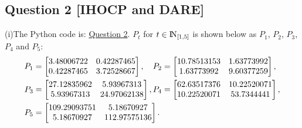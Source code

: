 \documentclass[a4paper,11pt,reqno]{amsart}
\newcommand{\N}{{\rm I\!N}}
\begin{document}
\subsection*{Question 2 [IHOCP and DARE]}\label{sec:q2}
(i)The Python code is: \href{https://github.com/Gczmy/ELE8088/blob/main/Lab1/Python_code/Question2/Question2.py}{Question 2}. 
$P_t$ for $t\in\N_{[1,5]}$ is shown below as $P_1$, $P_2$, $P_3$, $P_4$ and $P_5$:
$$\begin{aligned}
    P_1 &=
    \begin{bmatrix}
        3.48006722 & 0.42287465 \\
        0.42287465 & 3.72528667
    \end{bmatrix}, 
    \ \ \ P_2 =
    \begin{bmatrix}
        10.78513153 & 1.63773992 \\
        1.63773992 & 9.60377259
    \end{bmatrix},
    \\
    P_3 &=
    \begin{bmatrix}
        27.12835962 & 5.93967313 \\
        5.93967313 & 24.97062138
    \end{bmatrix}, 
    P_4 =
    \begin{bmatrix}
        62.63517376 & 10.22520071 \\
        10.22520071 & 53.7344441
    \end{bmatrix},
    \\
    P_5 &=
    \begin{bmatrix}
        109.29093751 & 5.18670927 \\
        5.18670927 & 112.97575136
    \end{bmatrix}.
    \notag
\end{aligned}$$
\end{document}

